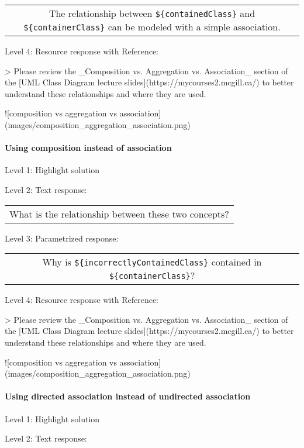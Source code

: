 \begin{tabular}{|c}
The relationship between \verb|${containedClass}| and \verb|${containerClass}| can be modeled with a simple association.
\end{tabular} \medskip

\noindent Level 4: Resource response with Reference:

> Please review the _Composition vs. Aggregation vs. Association_ section of 
the [UML Class Diagram lecture slides](https://mycourses2.mcgill.ca/) to 
better understand these relationships and where they are used.

![composition vs aggregation vs association](images/composition_aggregation_association.png)


\paragraph{Using composition instead of association}

\noindent Level 1: Highlight solution \medskip

\noindent Level 2: Text response: \medskip

\begin{tabular}{|c}
What is the relationship between these two concepts?
\end{tabular} \medskip

\noindent Level 3: Parametrized response: \medskip

\begin{tabular}{|c}
Why is \verb|${incorrectlyContainedClass}| contained in \verb|${containerClass}|?
\end{tabular} \medskip

\noindent Level 4: Resource response with Reference:

> Please review the _Composition vs. Aggregation vs. Association_ section of 
the [UML Class Diagram lecture slides](https://mycourses2.mcgill.ca/) to 
better understand these relationships and where they are used.

![composition vs aggregation vs association](images/composition_aggregation_association.png)


\paragraph{Using directed association instead of undirected association}

\noindent Level 1: Highlight solution \medskip

\noindent Level 2: Text response: \medskip

